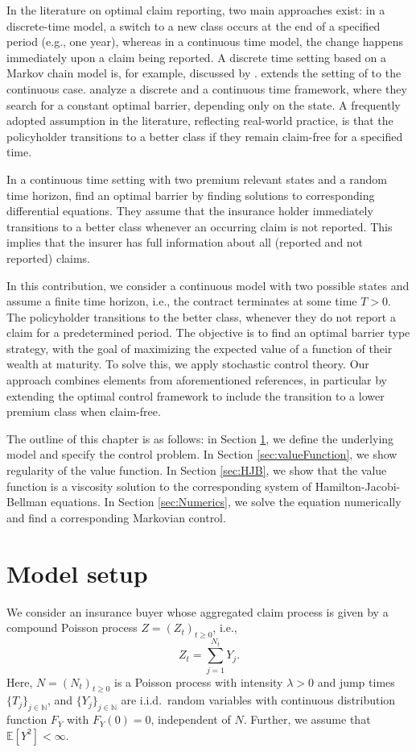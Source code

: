 \documentclass[a4paper]{scrartcl}
\theoremstyle{remark}
\theoremstyle{definition}
\numberwithin{equation}{section}
\begin{document}
In the literature on optimal claim reporting, two main approaches exist: in a discrete-time model, a switch to a new class occurs at the end of a specified period (e.g., one year), whereas in a continuous time model, the change happens immediately upon a claim being reported.  A discrete time setting based on a Markov chain model is, for example, discussed by  \cite{charpentier2017}.
\cite{DePril1979} extends the setting of \cite{Lanzenauer1974} to the continuous case. \cite{ZacksLevikson2004} analyze a discrete and a continuous time framework, where they search for a constant optimal barrier, depending only on the state. A frequently adopted assumption in the literature, reflecting real-world practice, is that the policyholder transitions to a better class if they remain claim-free for a specified time.  

In a continuous time setting with two premium relevant states and a random time horizon, \cite{ Young2025_meanvariance,Young2025} find an optimal barrier by finding solutions to corresponding differential equations. They assume that the insurance holder immediately transitions to a better class whenever an occurring claim is not reported. This implies that the insurer has full information about all (reported and not reported) claims.  

In this contribution, we consider a continuous model with two possible states and assume a finite time horizon, i.e., the contract terminates at some time $T>0$. The policyholder transitions to the better class, whenever they do not report a claim for a predetermined period. The objective is to find an optimal barrier type strategy, with the goal of maximizing the expected value of a function of their wealth at maturity. To solve this, we apply stochastic control theory. Our approach combines elements from aforementioned references, in particular by extending the optimal control framework to include the transition to a lower premium class when claim-free.

The outline of this chapter is as follows: in Section \ref{sec:ModelSetup}, we define the underlying model and specify the control problem. In Section \ref{sec:valueFunction}, we show regularity of the value function. In Section \ref{sec:HJB}, we show that the value function is a viscosity solution to the corresponding system of Hamilton-Jacobi-Bellman equations. In Section \ref{sec:Numerics}, we solve the equation numerically and find a corresponding Markovian control. 


\section{Model setup}
\label{sec:ModelSetup}
We consider an insurance buyer whose aggregated claim process is given by a compound Poisson process $Z=(Z_t)_{t\geq 0}$, i.e.,
\begin{equation*}
    Z_t = \sum_{j=1}^{N_t}Y_j.
\end{equation*}
Here, $N=(N_t)_{t\geq 0}$ is a Poisson process with intensity $\lambda>0$ and jump times $\{T_j\}_{j \in \mathbb{N}}$, and $\{Y_j\}_{j \in \mathbb{N}}$ are i.i.d.~random variables with continuous distribution function $F_Y$ with $F_Y(0)=0$, independent of $N$. Further, we assume that $\mathbb{E}[Y^2]<\infty$.
\end{document}

